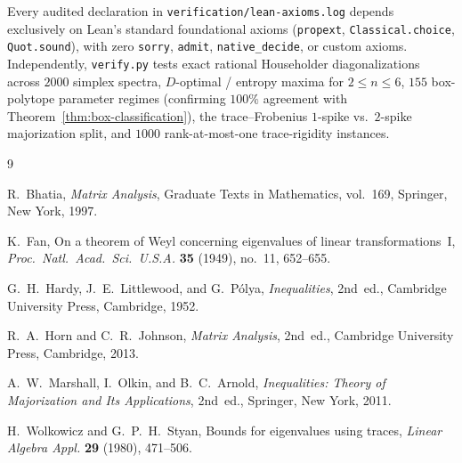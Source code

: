 \documentclass[11pt]{article}
\theoremstyle{definition}
\theoremstyle{remark}
\begin{document}
Every audited declaration in \texttt{verification/lean-axioms.log} depends exclusively on Lean's standard foundational axioms (\texttt{propext}, \texttt{Classical.choice}, \texttt{Quot.sound}), with zero \texttt{sorry}, \texttt{admit}, \texttt{native\_decide}, or custom axioms. Independently, \texttt{verify.py} tests exact rational Householder diagonalizations across $2000$ simplex spectra, $D$-optimal / entropy maxima for $2 \le n \le 6$, $155$ box-polytope parameter regimes (confirming $100\%$ agreement with Theorem~\ref{thm:box-classification}), the trace--Frobenius $1$-spike vs.\ $2$-spike majorization split, and $1000$ rank-at-most-one trace-rigidity instances.

\begin{thebibliography}{9}

R.~Bhatia,
\emph{Matrix Analysis},
Graduate Texts in Mathematics, vol.~169, Springer, New York, 1997.

K.~Fan,
On a theorem of Weyl concerning eigenvalues of linear transformations~I,
\emph{Proc.\ Natl.\ Acad.\ Sci.\ U.S.A.} \textbf{35} (1949), no.~11, 652--655.

G.~H.~Hardy, J.~E.~Littlewood, and G.~P\'olya,
\emph{Inequalities}, 2nd~ed.,
Cambridge University Press, Cambridge, 1952.

R.~A.~Horn and C.~R.~Johnson,
\emph{Matrix Analysis}, 2nd~ed.,
Cambridge University Press, Cambridge, 2013.

A.~W.~Marshall, I.~Olkin, and B.~C.~Arnold,
\emph{Inequalities: Theory of Majorization and Its Applications}, 2nd~ed.,
Springer, New York, 2011.

H.~Wolkowicz and G.~P.~H.~Styan,
Bounds for eigenvalues using traces,
\emph{Linear Algebra Appl.} \textbf{29} (1980), 471--506.

\end{thebibliography}
\end{document}
